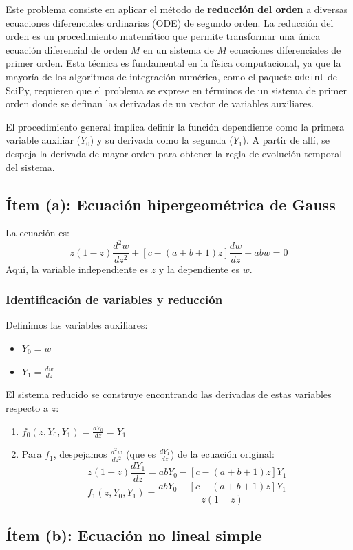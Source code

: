 \documentclass[a4paper]{article}
\begin{document}
Este problema consiste en aplicar el método de \textbf{reducción del orden} a diversas ecuaciones diferenciales ordinarias (ODE) de segundo orden. La reducción del orden es un procedimiento matemático que permite transformar una única ecuación diferencial de orden $M$ en un sistema de $M$ ecuaciones diferenciales de primer orden. Esta técnica es fundamental en la física computacional, ya que la mayoría de los algoritmos de integración numérica, como el paquete \texttt{odeint} de SciPy, requieren que el problema se exprese en términos de un sistema de primer orden donde se definan las derivadas de un vector de variables auxiliares. 

El procedimiento general implica definir la función dependiente como la primera variable auxiliar ($Y_0$) y su derivada como la segunda ($Y_1$). A partir de allí, se despeja la derivada de mayor orden para obtener la regla de evolución temporal del sistema.

\subsection{Ítem (a): Ecuación hipergeométrica de Gauss}

La ecuación es: 
$$ z(1-z) \frac{d^2w}{dz^2} + [c - (a+b+1)z] \frac{dw}{dz} - abw = 0 $$
Aquí, la variable independiente es $z$ y la dependiente es $w$.

\subsubsection{Identificación de variables y reducción}
Definimos las variables auxiliares:
\begin{itemize}
    \item $Y_0 = w$
    \item $Y_1 = \frac{dw}{dz}$
\end{itemize}

El sistema reducido se construye encontrando las derivadas de estas variables respecto a $z$:
\begin{enumerate}
    \item $f_0(z, Y_0, Y_1) = \frac{dY_0}{dz} = Y_1$
    \item Para $f_1$, despejamos $\frac{d^2w}{dz^2}$ (que es $\frac{dY_1}{dz}$) de la ecuación original:
    $$ z(1-z) \frac{dY_1}{dz} = ab Y_0 - [c - (a+b+1)z] Y_1 $$
    $$ f_1(z, Y_0, Y_1) = \frac{ab Y_0 - [c - (a+b+1)z] Y_1}{z(1-z)} $$
\end{enumerate}

\subsection{Ítem (b): Ecuación no lineal simple}
\end{document}
